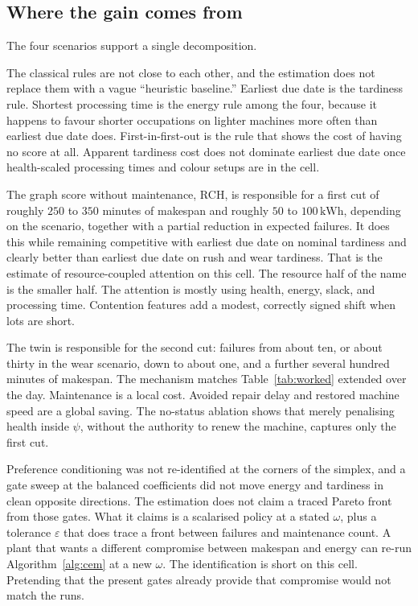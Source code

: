 \subsection{Where the gain comes from}

The four scenarios support a single decomposition.

The classical rules are not close to each other, and the estimation does not replace them with a vague ``heuristic baseline.'' Earliest due date is the tardiness rule. Shortest processing time is the energy rule among the four, because it happens to favour shorter occupations on lighter machines more often than earliest due date does. First-in-first-out is the rule that shows the cost of having no score at all. Apparent tardiness cost does not dominate earliest due date once health-scaled processing times and colour setups are in the cell.

The graph score without maintenance, RCH, is responsible for a first cut of roughly \(250\) to \(350\) minutes of makespan and roughly \(50\) to \(100\,\mathrm{kWh}\), depending on the scenario, together with a partial reduction in expected failures. It does this while remaining competitive with earliest due date on nominal tardiness and clearly better than earliest due date on rush and wear tardiness. That is the estimate of resource-coupled attention on this cell. The resource half of the name is the smaller half. The attention is mostly using health, energy, slack, and processing time. Contention features add a modest, correctly signed shift when lots are short.

The twin is responsible for the second cut: failures from about ten, or about thirty in the wear scenario, down to about one, and a further several hundred minutes of makespan. The mechanism matches Table~\ref{tab:worked} extended over the day. Maintenance is a local cost. Avoided repair delay and restored machine speed are a global saving. The no-status ablation shows that merely penalising health inside \(\psi\), without the authority to renew the machine, captures only the first cut.

Preference conditioning was not re-identified at the corners of the simplex, and a gate sweep at the balanced coefficients did not move energy and tardiness in clean opposite directions. The estimation does not claim a traced Pareto front from those gates. What it claims is a scalarised policy at a stated \(\omega\), plus a tolerance \(\varepsilon\) that does trace a front between failures and maintenance count. A plant that wants a different compromise between makespan and energy can re-run Algorithm~\ref{alg:cem} at a new \(\omega\). The identification is short on this cell. Pretending that the present gates already provide that compromise would not match the runs.

